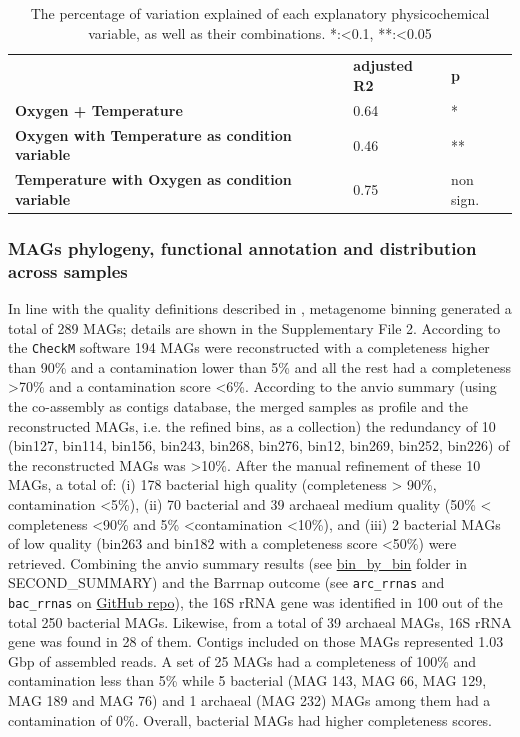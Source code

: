    \begin{table}
      \begin{tabular}{lll}
      \textbf{} & \textbf{adjusted R2} & \textbf{p} \\
      \textbf{Oxygen + Temperature} & 0.64 & * \\
      \textbf{Oxygen with Temperature as condition variable} & 0.46 & ** \\
      \textbf{Temperature with Oxygen as condition variable} & 0.75 & non sign.
      \end{tabular}
      \caption[Physicochemical variables explored]{The percentage of variation explained of each explanatory physicochemical variable, as well as their combinations. *:<0.1, **:<0.05}
      \label{table:psysicochem}
   \end{table}

\subsubsection*{MAGs phylogeny, functional annotation and distribution across samples}

   In line with the quality definitions described in \citep{bowers_minimum_2017}, metagenome binning generated a total of 289 MAGs; 
   details are shown in the Supplementary File 2. 
   According to the \texttt{CheckM} software 194 MAGs were reconstructed with a completeness higher than 90\% and a contamination lower than 5\% and 
   all the rest had a completeness >70\% and a contamination score <6\%. 
   According to the anvio summary (using the co-assembly as contigs database, the merged samples as profile and the reconstructed MAGs, i.e. the refined bins, as a collection) 
   the redundancy of 10 (bin127, bin114, bin156, bin243, bin268, bin276, bin12, bin269, bin252, bin226) of the reconstructed MAGs was >10\%. 
   After the manual refinement of these 10 MAGs, a total of: (i) 178 bacterial high quality (completeness > 90\%, contamination <5\%), 
   (ii) 70 bacterial and 39 archaeal medium quality (50\% < completeness <90\% and 5\% <contamination <10\%), and 
   (iii) 2 bacterial MAGs of low quality (bin263 and bin182 with a completeness score <50\%) were retrieved. 
   Combining the anvio summary results (see \href{https://github.com/hariszaf/karpathos-swamp/tree/main/anvio/SECOND_SUMMARY/bin_by_bin}{bin\_by\_bin} folder in SECOND\_SUMMARY) and 
   the Barrnap outcome (see \texttt{arc\_rrnas} and \texttt{bac\_rrnas} on \href{https://github.com/hariszaf/karpathos-swamp/tree/main/barrnap}{GitHub repo}), 
   the 16S rRNA gene was identified in 100 out of the total 250 bacterial MAGs. 
   Likewise, from a total of 39 archaeal MAGs, 16S rRNA gene was found in 28 of them. 
   Contigs included on those MAGs represented 1.03 Gbp of assembled reads. 
   A set of 25 MAGs had a completeness of 100\% and contamination less than 5\% while 5 bacterial (MAG 143, MAG 66, MAG 129, MAG 189 and MAG 76) 
   and 1 archaeal (MAG 232) MAGs among them had a contamination of 0\%. 
   Overall, bacterial MAGs had higher completeness scores. 


